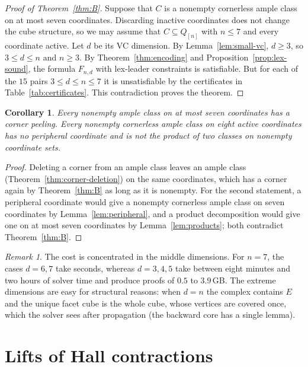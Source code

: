 \documentclass[11pt]{article}
\numberwithin{equation}{section}
\newtheorem{corollary}[theorem]{Corollary}
\theoremstyle{definition}
\theoremstyle{remark}
\newtheorem{remark}[theorem]{Remark}
\begin{document}
\begin{proof}[Proof of Theorem~\ref{thm:B}]
Suppose that \(C\) is a nonempty cornerless ample class on at most seven
coordinates.  Discarding inactive coordinates does not change the cube
structure, so we may assume that \(C\subseteq Q_{[n]}\) with \(n\le7\) and
every coordinate active.  Let \(d\) be its VC dimension.  By
Lemma~\ref{lem:small-vc}, \(d\ge3\), so \(3\le d\le n\) and \(n\ge3\).  By
Theorem~\ref{thm:encoding} and Proposition~\ref{prop:lex-sound}, the
formula \(F_{n,d}\) with lex-leader constraints is satisfiable.  But for
each of the \(15\) pairs \(3\le d\le n\le7\) it is unsatisfiable by the
certificates in Table~\ref{tab:certificates}.  This contradiction proves the
theorem.
\end{proof}

\begin{corollary}
\label{cor:seven-peelable}
Every nonempty ample class on at most seven coordinates has a corner
peeling.  Every nonempty cornerless ample class on eight active coordinates
has no peripheral coordinate and is not the product of two classes on
nonempty coordinate sets.
\end{corollary}

\begin{proof}
Deleting a corner from an ample class leaves an ample class
(Theorem~\ref{thm:corner-deletion}) on the same coordinates, which has a
corner again by Theorem~\ref{thm:B} as long as it is nonempty.  For the second
statement, a peripheral coordinate would give a nonempty cornerless ample
class on seven coordinates by Lemma~\ref{lem:peripheral}, and a product
decomposition would give one on at most seven coordinates by
Lemma~\ref{lem:products}; both contradict Theorem~\ref{thm:B}.
\end{proof}

\begin{remark}
\label{rem:cost}
The cost is concentrated in the middle dimensions.  For \(n=7\), the
cases \(d=6,7\) take seconds, whereas \(d=3,4,5\) take between eight
minutes and two hours of solver time and produce proofs of \(0.5\) to
\(3.9\)\,GB.  The extreme dimensions are easy for structural reasons: when
\(d=n\) the complex contains \(E\) and the unique facet cube is the whole
cube, whose vertices are covered once, which the solver sees after
propagation (the backward core has a single lemma).
\end{remark}

\section{Lifts of Hall contractions}
\label{sec:hall}
\end{document}
